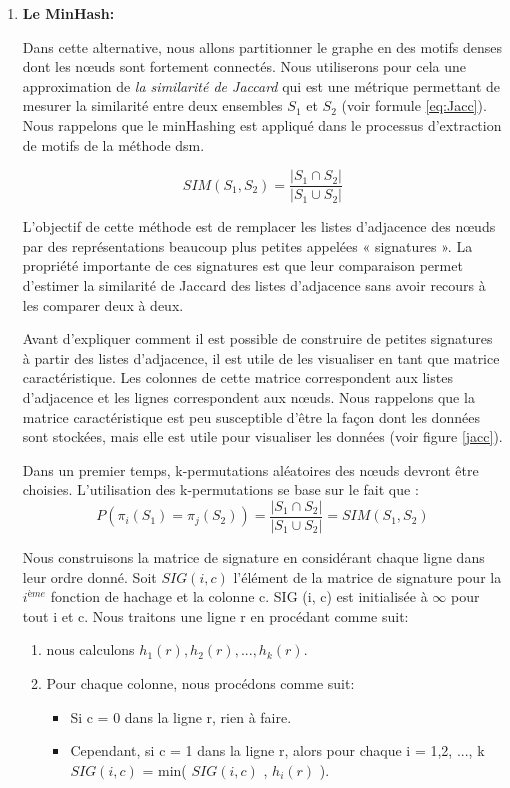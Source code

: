 \documentclass[a4paper,oneside,12pt]{report}
\theoremstyle{definition}
\begin{document}
\begin{enumerate}
\item \textbf{Le MinHash:}

Dans cette alternative, nous allons partitionner le graphe en des motifs denses dont les nœuds sont fortement connectés. Nous utiliserons pour cela une approximation de \textit{la similarité de Jaccard} qui est une métrique permettant de mesurer la similarité entre deux ensembles $S_1$ et $S_2$ (voir formule \ref{eq:Jacc}). Nous rappelons que le minHashing est appliqué dans le processus d'extraction de motifs de la méthode \gls{dsm}.

\begin{equation} \label{eq:Jacc}
SIM(S_1,S_2)=\frac{|S_1 \cap S_2|}{|S_1 \cup S_2|}
\end{equation}


L'objectif de cette méthode est de remplacer les listes d'adjacence des nœuds par des représentations beaucoup plus petites appelées « signatures ». La propriété importante de ces signatures est que leur comparaison permet d'estimer la similarité de Jaccard des listes d'adjacence sans avoir recours à les comparer deux à deux. 

Avant d'expliquer comment il est possible de construire de petites signatures à partir des listes d'adjacence, il est utile de les visualiser en tant que matrice caractéristique. Les colonnes de cette matrice correspondent aux listes d'adjacence et les lignes correspondent aux nœuds. Nous rappelons que la matrice caractéristique est peu susceptible d'être la façon dont les données sont stockées, mais elle est utile pour visualiser les données (voir figure \ref{jacc}). 


Dans un premier temps, k-permutations aléatoires des nœuds devront être choisies. L'utilisation des k-permutations se base sur le fait que :
\begin{equation} \label{eq:prob}
P(\pi_i(S_1) = \pi_j(S_2)) = \frac{|S_1 \cap S_2|}{|S_1 \cup S_2|} = SIM(S_1,S_2)
\end{equation}

 Nous construisons la matrice de signature en considérant chaque ligne dans leur ordre donné. Soit $SIG (i, c)$ l'élément de la matrice de signature pour la $i^{ème}$ fonction de hachage et la colonne c. SIG (i, c) est initialisée à $\infty$ pour tout i et c. Nous traitons une ligne r en procédant comme suit:
\begin{enumerate}
\item nous calculons $h_1 (r), h_2 (r), ..., h_k (r)$.
\item Pour chaque colonne, nous procédons comme suit: 
	\begin{itemize}
		\item  Si c = 0 dans la ligne r, rien à faire.
		\item  Cependant, si c = 1 dans la ligne r, alors pour chaque i = 1,2, ..., k  \\$SIG (i, c)$ = min( $SIG (i, c)$ , $h_i(r)$ ).
	\end{itemize}
\end{enumerate}





\end{enumerate}
\end{document}
